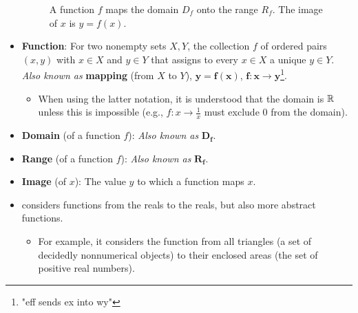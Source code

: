 \documentclass[../main.tex]{subfiles}
\begin{document}
\begin{itemize}
\begin{figure}[h!]
        \caption{A function $f$ maps the domain $D_f$ onto the range $R_f$. The image of $x$ is $y=f(x)$.}
        \label{fig:mapping}
    \end{figure}
    \item \textbf{Function}: For two nonempty sets $X,Y$, the collection $f$ of ordered pairs $(x,y)$ with $x\in X$ and $y\in Y$ that assigns to every $x\in X$ a unique $y\in Y$. \emph{Also known as} \textbf{mapping} (from $X$ to $Y$), $\bm{y=f(x)}$, $\bm{f:x\to y}$\footnote{"eff sends ex into wy"}.
    \begin{itemize}
        \item When using the latter notation, it is understood that the domain is $\mathbb{R}$ unless this is impossible (e.g., $f:x\to\frac{1}{x}$ must exclude 0 from the domain).
    \end{itemize}
    \item \textbf{Domain} (of a function $f$):  \emph{Also known as} $\bm{D_f}$.
    \item \textbf{Range} (of a function $f$):  \emph{Also known as} $\bm{R_f}$.
    \item \textbf{Image} (of $x$): The value $y$ to which a function maps $x$.
    \item \cite{bib:Thomas} considers functions from the reals to the reals, but also more abstract functions.
    \begin{itemize}
        \item For example, it considers the function from all triangles (a set of decidedly nonnumerical objects) to their enclosed areas (the set of positive real numbers).
    \end{itemize}
    \begin{figure}[h!]
        \centering
\end{figure}
\end{itemize}
\end{document}
